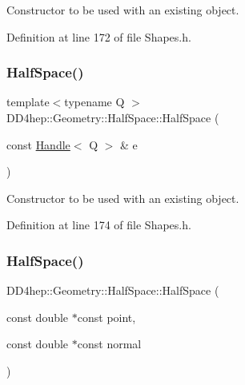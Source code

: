 Constructor to be used with an existing object. 



Definition at line 172 of file Shapes.\+h.

\hypertarget{class_d_d4hep_1_1_geometry_1_1_half_space_ad2e06a41bd3b59b4e8b8336e48d2c8df}{}\label{class_d_d4hep_1_1_geometry_1_1_half_space_ad2e06a41bd3b59b4e8b8336e48d2c8df} 
\subsubsection{\texorpdfstring{Half\+Space()}{HalfSpace()}\hspace{0.1cm}{\footnotesize\ttfamily [4/5]}}
{\footnotesize\ttfamily template$<$typename Q $>$ \\
D\+D4hep\+::\+Geometry\+::\+Half\+Space\+::\+Half\+Space (\begin{DoxyParamCaption}\item[{const \hyperlink{class_d_d4hep_1_1_handle}{Handle}$<$ Q $>$ \&}]{e }\end{DoxyParamCaption})\hspace{0.3cm}{\ttfamily [inline]}}



Constructor to be used with an existing object. 



Definition at line 174 of file Shapes.\+h.

\hypertarget{class_d_d4hep_1_1_geometry_1_1_half_space_adf737484b3071ad3fe7a41f24af83d4b}{}\label{class_d_d4hep_1_1_geometry_1_1_half_space_adf737484b3071ad3fe7a41f24af83d4b} 
\subsubsection{\texorpdfstring{Half\+Space()}{HalfSpace()}\hspace{0.1cm}{\footnotesize\ttfamily [5/5]}}
{\footnotesize\ttfamily D\+D4hep\+::\+Geometry\+::\+Half\+Space\+::\+Half\+Space (\begin{DoxyParamCaption}\item[{const double $\ast$const}]{point,  }\item[{const double $\ast$const}]{normal }\end{DoxyParamCaption})\hspace{0.3cm}{\ttfamily [inline]}}



